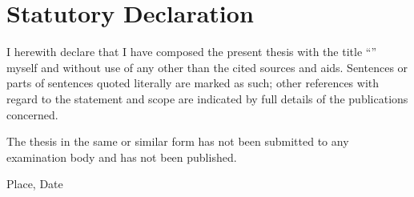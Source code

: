 \clearpage
\chapter*{Statutory Declaration}


I herewith declare that I have composed the present thesis with the title ``\textit{\DerTitelDerArbeit}'' myself and without use of any other than the cited sources and aids. Sentences or parts of sentences quoted literally are marked as such; other references with regard to the statement and scope are indicated by full details of the publications concerned.

The thesis in the same or similar form has not been submitted to any examination body and has not been published.

\vspace{3cm}
Place, Date \hfill \DerAutorDerArbeit
